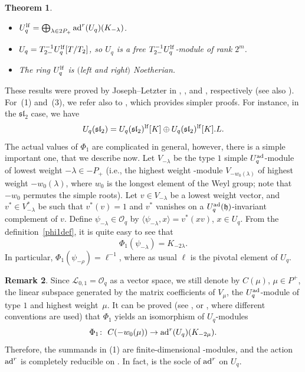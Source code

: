 \documentclass[10pt,a4paper]{amsart}
\numberwithin{equation}{section}
\newtheorem{teo}{Theorem}[section]
\theoremstyle{definition}
\newtheorem{Remark}[teo]{Remark}
\newcommand{\Ll}{{\mathcal L}}
\newcommand{\Oo}{{\mathcal O}}
\newcommand{\ra}{\rightarrow}
\begin{document}
\begin{teo} \label{JLteo1} \quad
\begin{itemize}\itemsep=0pt
\item[$(1)$] $U_q^{\rm lf} = \bigoplus_{\lambda \in 2P_+} {\rm ad}^r(U_q)(K_{-\lambda})$.
\item[$(2)$] $U_q = T_{2-}^{-1}U_q^{\rm lf}[T/T_{2}]$, so $U_q$ is a free $T_{2-}^{-1}U_q^{\rm lf}$-module of rank $2^m$.
\item[$(3)$] The ring $U_q^{\rm lf}$ is $($left and right$)$ Noetherian.
\end{itemize}
\end{teo}

These results were proved by Joseph--Letzter in \cite[Theorem~4.10]{JL2}, \cite[Theorem 6.4]{JL}, and \cite[Theorem~7.4.8]{Jos}, respectively (see also \cite[Sections~7.1.6, 7.1.13 and~7.1.25]{Jos}). For~(1) and~(3), we refer also to \cite[Theorems~3.113 and~3.137]{VY}, which provides simpler proofs. For instance, in the ${\mathfrak{sl}_2}$ case, we have
\[U_q({\mathfrak{sl}_2}) = U_q({\mathfrak{sl}_2})^{\rm lf}[K] \oplus U_q({\mathfrak{sl}_2})^{\rm lf}[K].L.\]
The actual values of $\Phi_1$ are complicated in general, however, there is a simple important one, that we describe now. Let $V_{-\lambda}$ be the type $1$ simple $U_q^{\rm ad}$-module of lowest weight $-\lambda\in -P_+$ (i.e., the highest weight -module $V_{-w_0(\lambda)}$ of highest weight $-w_0(\lambda)$, where $w_0$ is the longest element of the Weyl group; note that $-w_0$ permutes the simple roots). Let $v\in V_{-\lambda}$ be a lowest weight vector, and $v^*\in V_{-\lambda}^*$ be such that $v^*(v)=1$ and $v^*$ vanishes on a $U_q^{\rm ad}(\mathfrak{h})$-invariant complement of $v$. Define $\psi_{-\lambda}\in \Oo_q$ by $\langle \psi_{-\lambda},x\rangle = v^*(xv)$, $x\in U_q$. From the definition~\eqref{phi1def}, it is quite easy to see that
\begin{equation}\label{Phi1psi-}
\Phi_1(\psi_{-\lambda}) = K_{-2\lambda}.
\end{equation}
In particular, $\Phi_1(\psi_{-\rho}) = \ell^{-1}$, where as usual $\ell$ is the pivotal element of $U_q$.

\begin{Remark}\label{remsocle} Since $\Ll_{0,1}=\Oo_q$ as a vector space, we still denote by $C(\mu)$, $\mu\in P^+$, the linear subspace generated by the matrix coefficients of $V_\mu$, the $U_q^{\rm ad}$-module of type $1$ and highest weight~$\mu$. It can be proved (see \cite[Section~7.1.22]{Jos}, or \cite[p.~156]{VY}, where different conventions are used) that $\Phi_1$ yields an isomorphism of $U_q$-modules
\begin{equation}\label{restphi1}
\Phi_{1}\colon\ C(-w_0(\mu)) \ra {\rm ad}^r(U_q)(K_{-2\mu}).
\end{equation}
Therefore, the summands in (1) are finite-dimensional -modules, and the action ${\rm ad}^r$ is completely reducible on . In fact,  is the socle of ${\rm ad}^r$ on $U_q$.
\end{Remark}
\end{document}
